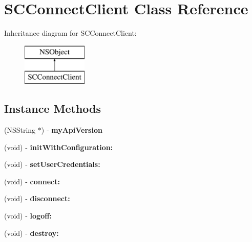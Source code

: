 \hypertarget{interface_s_c_connect_client}{}\section{S\+C\+Connect\+Client Class Reference}
\label{interface_s_c_connect_client}
Inheritance diagram for S\+C\+Connect\+Client\+:\begin{figure}[H]
\begin{center}
\leavevmode
\includegraphics[height=2.000000cm]{interface_s_c_connect_client}
\end{center}
\end{figure}
\subsection*{Instance Methods}
\begin{DoxyCompactItemize}
\item 
(N\+S\+String $\ast$) -\/ {\bfseries my\+Api\+Version}\hypertarget{interface_s_c_connect_client_afe72375276828ac1eed82cf73568731e}{}\label{interface_s_c_connect_client_afe72375276828ac1eed82cf73568731e}

\item 
(void) -\/ {\bfseries init\+With\+Configuration\+:}\hypertarget{interface_s_c_connect_client_afab17a906bf9cc550a3743a56dec25db}{}\label{interface_s_c_connect_client_afab17a906bf9cc550a3743a56dec25db}

\item 
(void) -\/ {\bfseries set\+User\+Credentials\+:}\hypertarget{interface_s_c_connect_client_ab2c43fb59f1524546729ca2188000a70}{}\label{interface_s_c_connect_client_ab2c43fb59f1524546729ca2188000a70}

\item 
(void) -\/ {\bfseries connect\+:}\hypertarget{interface_s_c_connect_client_a917252090d567f9a3b4e0c19039eef6c}{}\label{interface_s_c_connect_client_a917252090d567f9a3b4e0c19039eef6c}

\item 
(void) -\/ {\bfseries disconnect\+:}\hypertarget{interface_s_c_connect_client_a9246bacac3331cf31bbbf4a62a61a262}{}\label{interface_s_c_connect_client_a9246bacac3331cf31bbbf4a62a61a262}

\item 
(void) -\/ {\bfseries logoff\+:}\hypertarget{interface_s_c_connect_client_aab2051e0ffd615abe2f21aff0b4c04a9}{}\label{interface_s_c_connect_client_aab2051e0ffd615abe2f21aff0b4c04a9}

\item 
(void) -\/ {\bfseries destroy\+:}\hypertarget{interface_s_c_connect_client_a0161a7e0fb0052d9ae3dbc1cdb5b9703}{}\label{interface_s_c_connect_client_a0161a7e0fb0052d9ae3dbc1cdb5b9703}

\end{DoxyCompactItemize}
